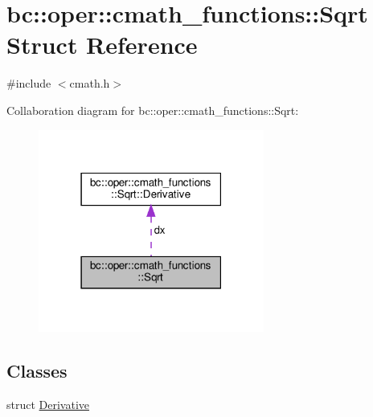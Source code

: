 \hypertarget{structbc_1_1oper_1_1cmath__functions_1_1Sqrt}{}\section{bc\+:\+:oper\+:\+:cmath\+\_\+functions\+:\+:Sqrt Struct Reference}
\label{structbc_1_1oper_1_1cmath__functions_1_1Sqrt}


{\ttfamily \#include $<$cmath.\+h$>$}



Collaboration diagram for bc\+:\+:oper\+:\+:cmath\+\_\+functions\+:\+:Sqrt\+:\nopagebreak
\begin{figure}[H]
\begin{center}
\leavevmode
\includegraphics[width=210pt]{structbc_1_1oper_1_1cmath__functions_1_1Sqrt__coll__graph}
\end{center}
\end{figure}
\subsection*{Classes}
\begin{DoxyCompactItemize}
\item 
struct \hyperlink{structbc_1_1oper_1_1cmath__functions_1_1Sqrt_1_1Derivative}{Derivative}
\end{DoxyCompactItemize}
